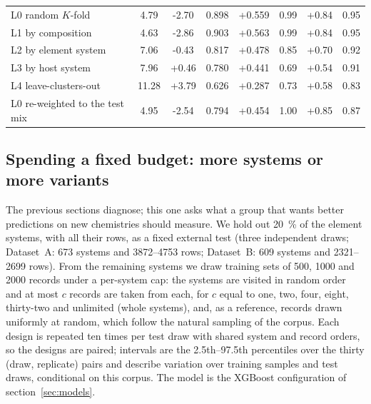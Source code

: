 \documentclass{iopjournal}
\begin{document}
\begin{table}[t]
\begin{tabular}{@{}lS[table-format=2.2]S[table-format=-1.2]S[table-format=1.3]S[table-format=-1.3]S[table-format=1.2]S[table-format=-1.2]S[table-format=1.2]@{}}
L0 random $K$-fold & 4.79 & -2.70 & 0.898 & +0.559 & 0.99 & +0.84 & 0.95 \\
L1 by composition & 4.63 & -2.86 & 0.903 & +0.563 & 0.99 & +0.84 & 0.95 \\
L2 by element system & 7.06 & -0.43 & 0.817 & +0.478 & 0.85 & +0.70 & 0.92 \\
L3 by host system & 7.96 & +0.46 & 0.780 & +0.441 & 0.69 & +0.54 & 0.91 \\
L4 leave-clusters-out & 11.28 & +3.79 & 0.626 & +0.287 & 0.73 & +0.58 & 0.83 \\
L0 re-weighted to the test mix & 4.95 & -2.54 & 0.794 & +0.454 & 1.00 & +0.85 & 0.87 \\
\bottomrule
\end{tabular}
\end{table}



\subsection{Spending a fixed budget: more systems or more variants}
\label{sec:acquisition}

The previous sections diagnose; this one asks what a group that wants better predictions on new
chemistries should measure. We hold out \SI{20}{\percent} of the element systems, with all their rows, as a
fixed external test (three independent draws; Dataset~A: \num{673} systems and
\numrange{3872}{4753} rows; Dataset~B:
\num{609} systems and
\numrange{2321}{2699} rows). From the remaining
systems we draw training sets of \num{500}, \num{1000} and \num{2000} records under a
per-system cap: the systems are visited in random order and at most $c$ records are taken from each, for
$c$ equal to one, two, four, eight, thirty-two and unlimited (whole systems), and, as a reference, records drawn
uniformly at random, which follow the natural sampling of the corpus. Each design is repeated ten times
per test draw with shared system and record orders, so the designs are paired; intervals are the
2.5th--97.5th percentiles over the thirty (draw, replicate) pairs and describe variation over training samples
and test draws, conditional on this corpus. The model is the XGBoost configuration of
section~\ref{sec:models}.
\end{document}
